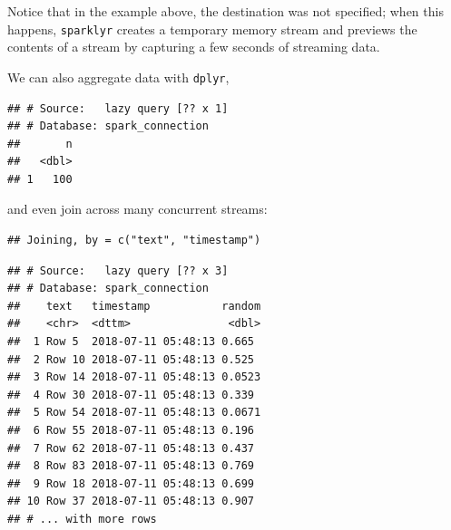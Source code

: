 \documentclass[]{book}
\newenvironment{Shaded}{\begin{snugshade}}{\end{snugshade}}
\newcommand{\DataTypeTok}[1]{\textcolor[rgb]{0.13,0.29,0.53}{#1}}
\newcommand{\KeywordTok}[1]{\textcolor[rgb]{0.13,0.29,0.53}{\textbf{#1}}}
\newcommand{\NormalTok}[1]{#1}
\newcommand{\OperatorTok}[1]{\textcolor[rgb]{0.81,0.36,0.00}{\textbf{#1}}}
\newcommand{\StringTok}[1]{\textcolor[rgb]{0.31,0.60,0.02}{#1}}
\theoremstyle{definition}
\theoremstyle{definition}
\theoremstyle{definition}
\theoremstyle{remark}
\begin{document}
Notice that in the example above, the destination was not specified;
when this happens, \texttt{sparklyr} creates a temporary memory stream
and previews the contents of a stream by capturing a few seconds of
streaming data.

We can also aggregate data with \texttt{dplyr},

\begin{Shaded}
\end{Shaded}

\begin{verbatim}
## # Source:   lazy query [?? x 1]
## # Database: spark_connection
##       n
##   <dbl>
## 1   100
\end{verbatim}

and even join across many concurrent streams:

\begin{Shaded}
\end{Shaded}

\begin{verbatim}
## Joining, by = c("text", "timestamp")
\end{verbatim}

\begin{verbatim}
## # Source:   lazy query [?? x 3]
## # Database: spark_connection
##    text   timestamp           random
##    <chr>  <dttm>               <dbl>
##  1 Row 5  2018-07-11 05:48:13 0.665 
##  2 Row 10 2018-07-11 05:48:13 0.525 
##  3 Row 14 2018-07-11 05:48:13 0.0523
##  4 Row 30 2018-07-11 05:48:13 0.339 
##  5 Row 54 2018-07-11 05:48:13 0.0671
##  6 Row 55 2018-07-11 05:48:13 0.196 
##  7 Row 62 2018-07-11 05:48:13 0.437 
##  8 Row 83 2018-07-11 05:48:13 0.769 
##  9 Row 18 2018-07-11 05:48:13 0.699 
## 10 Row 37 2018-07-11 05:48:13 0.907 
## # ... with more rows
\end{verbatim}
\end{document}
